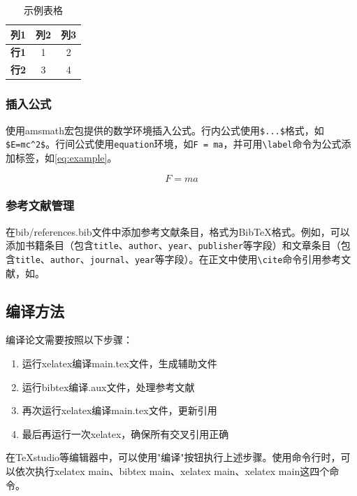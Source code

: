 \begin{table}[htbp]
    \centering
    \caption{示例表格}
    \label{tab:example}
    \begin{tabular}{ccc}
        \toprule    
        \textbf{列1} & \textbf{列2} & \textbf{列3} \\
        \midrule
        \textbf{行1} & 1 & 2 \\
        \textbf{行2} & 3 & 4 \\
        \bottomrule
    \end{tabular}   
\end{table}

\subsubsection{插入公式}
使用amsmath宏包提供的数学环境插入公式。行内公式使用\verb|$...$|格式，如\verb|$E=mc^2$|。行间公式使用\verb|equation|环境，如\verb|F = ma|，并可用\verb|\label|命令为公式添加标签，如\ref{eq:example}。

\begin{equation}
    \label{eq:example}
    F = ma
\end{equation}

\subsubsection{参考文献管理}
在bib/references.bib文件中添加参考文献条目，格式为BibTeX格式。例如，可以添加书籍条目（包含\verb|title|、\verb|author|、\verb|year|、\verb|publisher|等字段）和文章条目（包含\verb|title|、\verb|author|、\verb|journal|、\verb|year|等字段）。在正文中使用\verb|\cite|命令引用参考文献，如\cite{kopka2003guide}。

\subsection{编译方法}
编译论文需要按照以下步骤：

\begin{enumerate}
    \item 运行xelatex编译main.tex文件，生成辅助文件
    \item 运行bibtex编译.aux文件，处理参考文献
    \item 再次运行xelatex编译main.tex文件，更新引用
    \item 最后再运行一次xelatex，确保所有交叉引用正确
\end{enumerate}

在TeXstudio等编辑器中，可以使用"编译"按钮执行上述步骤。使用命令行时，可以依次执行xelatex main、bibtex main、xelatex main、xelatex main这四个命令。

